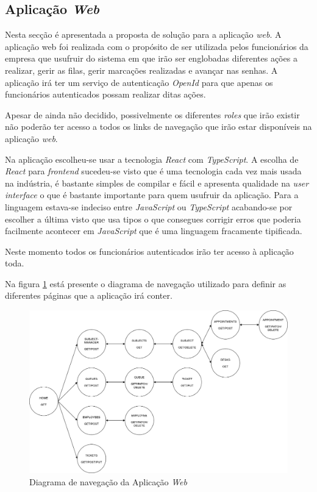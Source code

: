 \documentclass[12pt,a4paper]{article}
\begin{document}
\subsection{Aplicação \textit{Web}}
Nesta secção é apresentada a proposta de solução para a aplicação \textit{web}. A aplicação web foi realizada com o propósito de ser utilizada pelos funcionários 
da empresa que usufruir do sistema em que irão ser englobadas diferentes ações a realizar, gerir as filas, gerir marcações realizadas e avançar nas senhas.
A aplicação irá ter um serviço de autenticação \textit{OpenId}\cite{openIDReference} para que apenas os funcionários autenticados possam realizar ditas ações.\par
Apesar de ainda não decidido, possivelmente os diferentes \textit{roles} que irão existir não poderão ter acesso a todos os links de navegação que 
irão estar disponíveis na aplicação \textit{web}.\par
Na aplicação escolheu-se usar a tecnologia \textit{React}\cite{reactReference} com \textit{TypeScript}\cite{typescriptReference}. A escolha de \textit{React}\cite{reactReference}
para \textit{frontend} sucedeu-se visto que é uma tecnologia cada vez mais usada na indústria, é bastante simples de compilar e fácil e apresenta qualidade na \textit{user interface} 
o que é bastante importante para quem usufruir da aplicação. Para a linguagem estava-se indeciso entre \textit{JavaScript}\cite{javascriptReference} ou \textit{TypeScript}\cite{typescriptReference} acabando-se por escolher a última visto que
usa tipos o que consegues corrigir erros que poderia facilmente acontecer em \textit{JavaScript}\cite{javascriptReference} que é uma linguagem fracamente tipificada.\par
Neste momento todos os funcionários autenticados irão ter acesso à aplicação toda.\par
Na figura \ref{fig:figure2} está presente o diagrama de navegação utilizado para definir as diferentes páginas que a aplicação irá conter.
\begin{landscape}
    \begin{figure}
        \centering
        \includegraphics[scale=0.5]{Hypermedia-Navigation}
        \caption{Diagrama de navegação da Aplicação \textit{Web}}
        \label{fig:figure2}
    \end{figure}
\end{landscape} 
\end{document}
